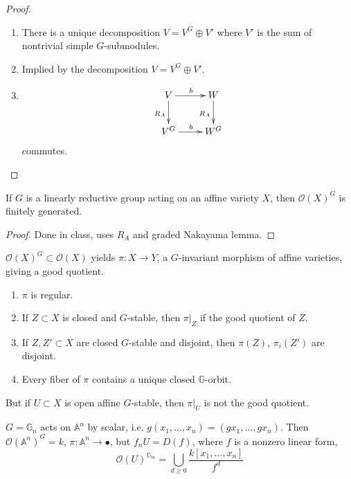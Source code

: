 \begin{proof}
\begin{enumerate}
\item There is a unique decomposition $V=V^G
\oplus V'$ where $V'$ is the sum of
nontrivial simple $G$-submodules.
\item Implied by the decomposition $V=V^G
\oplus V'$.
\item
$$
\xymatrix{
V\ar[d]_{R_A}\ar[r]^b&  W\ar[d]_{R_A}\\
V^G\ar[r]^{b}&W^G
}
$$
commutes.
\end{enumerate}
\end{proof}

\begin{theorem}
\label{git-label-011}
If $G$ is a linearly reductive group acting
on an affine variety $X$, then
$\mathcal{O}(X)^G$ is finitely generated.
\end{theorem}

\begin{proof}
Done in class, uses $R_A$ and graded Nakayama
lemma.
\end{proof}

\medskip\noindent
$\mathcal{O}(X)^G \subset \mathcal{O}(X)$
yields $\pi:X\to Y$, a $G$-invariant morphism
of affine varieties, giving a good quotient.

\begin{proposition}
\label{proposition-projection}
\begin{enumerate}
\item $\pi$ is regular.
\item If  $Z \subset X$ is closed and
$G$-stable, then $\pi|_{Z}$ if the good
quotient of $Z$.
\item If $Z,Z'\subset X$ are closed
$G$-stable and disjoint, then $\pi(Z)$,
$\pi_i(Z')$ are disjoint.
\item Every fiber of $\pi$ contains a unique
closed $\mathbb{G}$-orbit.
\end{enumerate}
But if $U\subset X$ is open affine
$G$-stable, then $\pi|_{U}$ is not the good
quotient.
\end{proposition}

\begin{example}
\label{example-Hopf-surface?}
$G=\mathbb{G}_n$ acts on $\mathbb{A}^n$ by
scalar, i.e.
$g(x_1,\ldots,x_n)=(gx_1,\ldots,gx_n)$. Then
$\mathcal{O}(\mathbb{A}^n)^G=k$,
$\pi:\mathbb{A}^n \to \bullet$, but
$f_nU=D(f)$, where $f$ is a nonzero linear
form,
$$
\mathcal{O}(U)^{\mathbb{G}_m}=\bigcup_{d \geq
0}\frac{k[x_1,\ldots,x_n]}{f^d}
$$
\end{example}

